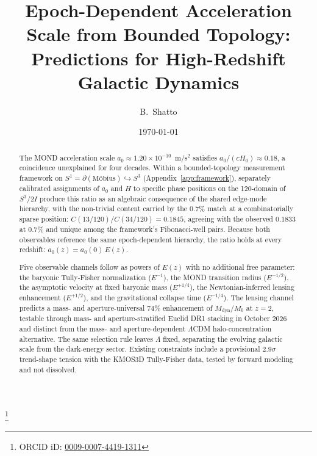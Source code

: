\documentclass[
    aps,
    prd,
    reprint,
    superscriptaddress,
    nofootinbib,
    floatfix
]{revtex4-2}
\begin{document}
\title{Epoch-Dependent Acceleration Scale from Bounded Topology:
       Predictions for High-Redshift Galactic Dynamics}

\author{B.~Shatto}
\thanks{ORCID iD: \href{https://orcid.org/0009-0007-4419-1311}{0009-0007-4419-1311}}

\date{\today}

\begin{abstract}
The MOND acceleration scale $a_0 \approx 1.20 \times 10^{-10}$~m/s$^2$
satisfies $a_0/(cH_0) \approx 0.18$, a coincidence unexplained for four
decades. Within a bounded-topology measurement framework on
$S^1 = \partial(\text{M\"obius}) \hookrightarrow S^3$
(Appendix~\ref{app:framework}), separately calibrated assignments of
$a_0$ and $H$ to specific phase positions on the 120-domain of $S^3/2I$
produce this ratio as an algebraic consequence of the shared edge-mode
hierarchy, with the non-trivial content carried by the 0.7\% match at a
combinatorially sparse position: $C(13/120)/C(34/120) = 0.1845$,
agreeing with the observed $0.1833$ at $0.7\%$ and unique among the
framework's Fibonacci-well pairs. Because both observables reference the
same epoch-dependent hierarchy, the ratio holds at every redshift:
$a_0(z) = a_0(0)\,E(z)$.

Five observable channels follow as powers of
$E(z)$ with no additional free parameter: the baryonic Tully-Fisher
normalization ($E^{-1}$), the MOND transition radius ($E^{-1/2}$), the
asymptotic velocity at fixed baryonic mass ($E^{+1/4}$), the
Newtonian-inferred lensing enhancement ($E^{+1/2}$), and the
gravitational collapse time ($E^{-1/4}$). The lensing channel predicts
a mass- and aperture-universal 74\% enhancement of $M_\text{dyn}/M_b$
at $z = 2$, testable through mass- and aperture-stratified Euclid DR1
stacking in October 2026 and distinct from the mass- and
aperture-dependent $\Lambda$CDM halo-concentration alternative. The
same selection rule leaves $\Lambda$ fixed, separating the evolving
galactic scale from the dark-energy sector. Existing constraints
include a provisional 2.9$\sigma$ trend-shape tension with the KMOS3D
Tully-Fisher data, tested by forward modeling and not dissolved.
\end{abstract}

\maketitle
\end{document}
